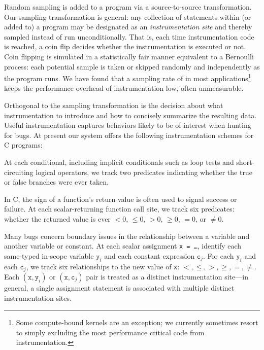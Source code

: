 \documentclass[preprint,final]{sigplanconf}
\begin{document}
Random sampling is added to a program via a source-to-source
transformation.  Our sampling transformation is general: any
collection of statements within (or added to) a program may be
designated as an \emph{instrumentation site} and thereby sampled instead of run
unconditionally.  That is, each time instrumentation code is reached,
a coin flip decides whether the instrumentation is executed or not.
Coin flipping is simulated in a statistically fair manner equivalent
to a Bernoulli process: each potential sample is taken or skipped
randomly and independently as the program runs.  We have found that a
sampling rate of  in most applications\footnote{Some compute-bound kernels are an exception; we currently sometimes resort to simply
excluding the most performance critical code from instrumentation.} keeps the performance overhead of instrumentation low, often unmeasurable.

Orthogonal to the sampling transformation is the decision about what
instrumentation to introduce and how to concisely summarize the
resulting data.  Useful instrumentation captures behaviors likely to
be of interest when hunting for bugs.  At present our system offers
the following instrumentation schemes for C programs:

\begin{description}
\sloppy
\item[branches:] At each conditional, including implicit conditionals
such as loop tests and short-circuiting logical operators, we track two predicates
indicating whether the true or false branches were ever taken.

\item[returns:] In C, the
  sign of a function's return value is often used to signal success or failure.
  At each scalar-returning function call site, we track six predicates:
  whether the returned value is ever $< 0$, $\leq 0$, $> 0$, $\geq 0$,
  $= 0$, or $\neq 0$.

\item[scalar-pairs:] Many bugs
  concern boundary issues in the relationship between a
  variable and another variable or constant.  At
  each scalar assignment \texttt{x = \dots}, identify each
  same-typed in-scope variable $\mathtt{y}_i$ and each
  constant expression $\mathtt{c}_j$.  For each   $\mathtt{y}_i$ and each $\mathtt{c}_j$,
  we track six relationships to the new value of \texttt{x}: $<, \leq, >, \geq, =, \neq$.
  Each $(\mathtt{x}, \mathtt{y}_i)$ or $(\mathtt{x}, \mathtt{c}_j)$ pair
  is treated as a distinct instrumentation site---in general, a single assignment statement is associated with multiple distinct instrumentation sites.
\end{description}
\end{document}
